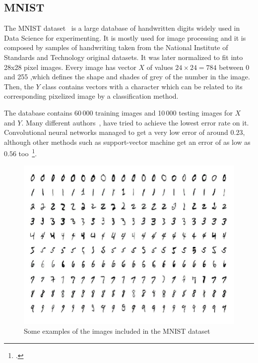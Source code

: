 \subsection{MNIST}
\label{subsec:MNIST}


The MNIST dataset~\cite{MNIST_article} is a large database of handwritten digits widely used in Data Science for experimenting. It is mostly used for image processing and it is composed by samples of handwriting taken from the National Institute of Standards and Technology original datasets. It was later normalized to fit into 28x28 pixel images. Every image has vector $X$ of values $24 \times 24 = 784$ between 0 and 255 ,which defines the shape and shades of grey of the number in the image. Then, the $Y$ class contains vectors with a character which can be related to its corresponding pixelized image by a classification method. \par

The database contains 60\,000 training images and 10\,000 testing images for $X$ and $Y$. Many different authors~\cite{MNIST_classification_example}, have tried to achieve the lowest error rate on it. Convolutional neural networks managed to get a very low error of around $0.23$, although other methods such as support-vector machine get an error of as low as $0.56$ too~\footcite{wiki:MNIST}.
%
\begin{figure}[H]
\centering
  \includegraphics[width=16cm]{Figuras_tfg/Figure_MNIST}
  \caption{Some examples of the images included in the MNIST dataset}
 \label{fig:figure_MNIST}
\end{figure}

